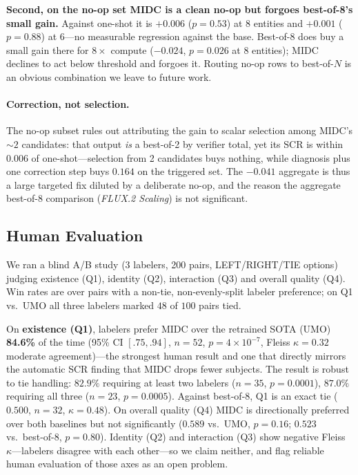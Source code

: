 \documentclass[letterpaper]{article}
\begin{document}
\textbf{Second, on the no-op set MIDC is a clean no-op but forgoes best-of-8's small gain.} Against one-shot it is $+0.006$ ($p{=}0.53$) at 8 entities and $+0.001$ ($p{=}0.88$) at 6---no measurable regression against the base. Best-of-8 does buy a small gain there for $8\times$ compute ($-0.024$, $p{=}0.026$ at 8 entities); MIDC declines to act below threshold and forgoes it. Routing no-op rows to best-of-$N$ is an obvious combination we leave to future work.

\paragraph{Correction, not selection.} The no-op subset rules out attributing the gain to scalar selection among MIDC's ${\sim}2$ candidates: that output \emph{is} a best-of-2 by verifier total, yet its SCR is within $0.006$ of one-shot---selection from 2 candidates buys nothing, while diagnosis plus one correction step buys $0.164$ on the triggered set. The $-0.041$ aggregate is thus a large targeted fix diluted by a deliberate no-op, and the reason the aggregate best-of-8 comparison (\emph{FLUX.2 Scaling}) is not significant.

\subsection{Human Evaluation}
\label{sec:human}

We ran a blind A/B study (3 labelers, 200 pairs, LEFT/RIGHT/TIE options) judging existence (Q1), identity (Q2), interaction (Q3) and overall quality (Q4). Win rates are over pairs with a non-tie, non-evenly-split labeler preference; on Q1 vs.\ UMO all three labelers marked $48$ of $100$ pairs tied.

On \textbf{existence (Q1)}, labelers prefer MIDC over the retrained SOTA (UMO) \textbf{84.6\%} of the time (95\% CI $[.75,.94]$, $n{=}52$, $p{=}4{\times}10^{-7}$, Fleiss $\kappa{=}0.32$ moderate agreement)---the strongest human result and one that directly mirrors the automatic SCR finding that MIDC drops fewer subjects. The result is robust to tie handling: $82.9\%$ requiring at least two labelers ($n{=}35$, $p{=}0.0001$), $87.0\%$ requiring all three ($n{=}23$, $p{=}0.0005$). Against best-of-8, Q1 is an exact tie ($0.500$, $n{=}32$, $\kappa{=}0.48$). On overall quality (Q4) MIDC is directionally preferred over both baselines but not significantly ($0.589$ vs.\ UMO, $p{=}0.16$; $0.523$ vs.\ best-of-8, $p{=}0.80$). Identity (Q2) and interaction (Q3) show negative Fleiss $\kappa$---labelers disagree with each other---so we claim neither, and flag reliable human evaluation of those axes as an open problem.
\end{document}

